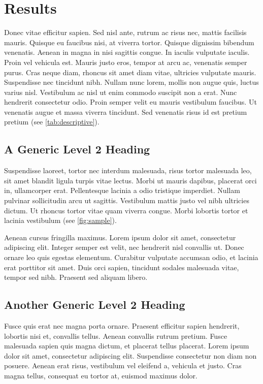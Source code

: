 \section{Results}
\label{sec:4}

Donec vitae efficitur sapien. Sed nisl ante, rutrum ac risus nec, mattis facilisis mauris. Quisque eu faucibus nisi, at viverra tortor. Quisque dignissim bibendum venenatis. Aenean in magna in nisi sagittis congue. In iaculis vulputate iaculis. Proin vel vehicula est. Mauris justo eros, tempor at arcu ac, venenatis semper purus. Cras neque diam, rhoncus sit amet diam vitae, ultricies vulputate mauris. Suspendisse nec tincidunt nibh. Nullam nunc lorem, mollis non augue quis, luctus varius nisl. Vestibulum ac nisl ut enim commodo suscipit non a erat. Nunc hendrerit consectetur odio. Proin semper velit eu mauris vestibulum faucibus. Ut venenatis augue et massa viverra tincidunt. Sed venenatis risus id est pretium pretium (see \cref{tab:descriptive}).

\subsection{A Generic Level 2 Heading}

Suspendisse laoreet, tortor nec interdum malesuada, risus tortor malesuada leo, sit amet blandit ligula turpis vitae lectus. Morbi ut mauris dapibus, placerat orci in, ullamcorper erat. Pellentesque lacinia a odio tristique imperdiet. Nullam pulvinar sollicitudin arcu ut sagittis. Vestibulum mattis justo vel nibh ultricies dictum. Ut rhoncus tortor vitae quam viverra congue. Morbi lobortis tortor et lacinia vestibulum (see \cref{fig:sample}).



Aenean cursus fringilla maximus. Lorem ipsum dolor sit amet, consectetur adipiscing elit. Integer semper est velit, nec hendrerit nisl convallis ut. Donec ornare leo quis egestas elementum. Curabitur vulputate accumsan odio, et lacinia erat porttitor sit amet. Duis orci sapien, tincidunt sodales malesuada vitae, tempor sed nibh. Praesent sed aliquam libero.

\subsection{Another Generic Level 2 Heading}

Fusce quis erat nec magna porta ornare. Praesent efficitur sapien hendrerit, lobortis nisi et, convallis tellus. Aenean convallis rutrum pretium. Fusce malesuada sapien quis magna dictum, et placerat tellus placerat. Lorem ipsum dolor sit amet, consectetur adipiscing elit. Suspendisse consectetur non diam non posuere. Aenean erat risus, vestibulum vel eleifend a, vehicula et justo. Cras magna tellus, consequat eu tortor at, euismod maximus dolor.

